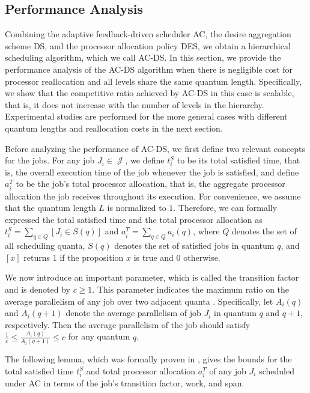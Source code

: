 \documentclass[10pt, a4paper]{article}
\newcommand{\calset}[1]{\ensuremath{\mathop{\mathcal{#1}}\nolimits}}
\newcommand{\jobset}{\calset{J}}
\begin{document}
\subsection{Performance Analysis}

Combining the adaptive feedback-driven scheduler AC, the desire aggregation scheme DS, and the
processor allocation policy DES, we obtain a hierarchical scheduling algorithm, which we call
AC-DS. In this section, we provide the performance analysis of the AC-DS algorithm when there is
negligible cost for processor reallocation and all levels share the same quantum length.
Specifically, we show that the competitive ratio achieved by AC-DS in this case is scalable, that
is, it does not increase with the number of levels in the hierarchy. Experimental studies are
performed for the more general cases with different quantum lengths and reallocation costs in the
next section.

Before analyzing the performance of AC-DS, we first define two relevant concepts for the jobs. For
any job $J_i \in \jobset$, we define $t^S_i$ to be its total satisfied time, that is, the overall
execution time of the job whenever the job is satisfied, and define $a_i^T$ to be the job's total
processor allocation, that is, the aggregate processor allocation the job receives throughout its
execution. For convenience, we assume that the quantum length $L$ is normalized to $1$. Therefore,
we can formally expressed the total satisfied time and the total processor allocation as $t^S_i =
\sum_{q\in Q} [J_i \in S(q)]$ and $a_i^T = \sum_{q\in Q} a_i(q)$, where $Q$ denotes the set of all
scheduling quanta, $S(q)$ denotes the set of satisfied jobs in quantum $q$, and $[x]$ returns 1 if
the proposition $x$ is true and 0 otherwise.

We now introduce an important parameter, which is called the transition factor and is denoted by $c
\ge 1$. This parameter indicates the maximum ratio on the average parallelism of any job over two
adjacent quanta \cite{SunCaHs11,SunHs08}. Specifically, let $A_i(q)$ and $A_i(q+1)$ denote the
average parallelism of job $J_i$ in quantum $q$ and $q+1$, respectively. Then the average
parallelism of the job should satisfy $\frac{1}{c} \le \frac{A_i(q)}{A_i(q+1)} \le c$ for any
quantum $q$.

The following lemma, which was formally proven in \cite{SunCaHs11,SunHs08}, gives the bounds for
the total satisfied time $t^S_i$ and total processor allocation $a_i^T$ of any job $J_i$ scheduled
under AC in terms of the job's transition factor, work, and span.
\end{document}
